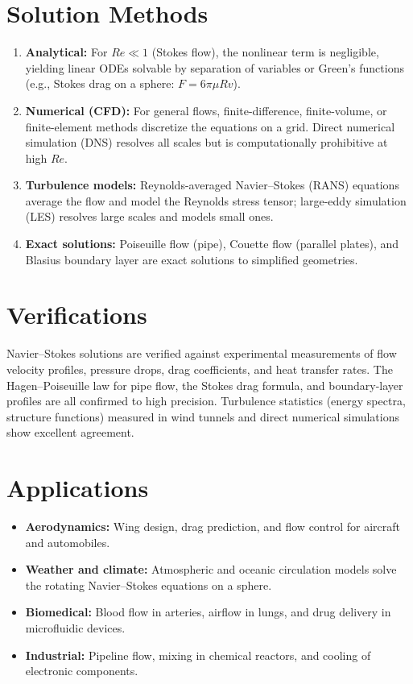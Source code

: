 \section*{Solution Methods}

\begin{enumerate}
  \item \textbf{Analytical:} For $Re \ll 1$ (Stokes flow), the nonlinear term is negligible, yielding linear ODEs solvable by separation of variables or Green's functions (e.g., Stokes drag on a sphere: $F = 6\pi\mu R v$).
  \item \textbf{Numerical (CFD):} For general flows, finite-difference, finite-volume, or finite-element methods discretize the equations on a grid. Direct numerical simulation (DNS) resolves all scales but is computationally prohibitive at high $Re$.
  \item \textbf{Turbulence models:} Reynolds-averaged Navier--Stokes (RANS) equations average the flow and model the Reynolds stress tensor; large-eddy simulation (LES) resolves large scales and models small ones.
  \item \textbf{Exact solutions:} Poiseuille flow (pipe), Couette flow (parallel plates), and Blasius boundary layer are exact solutions to simplified geometries.
\end{enumerate}
\section*{Verifications}

Navier--Stokes solutions are verified against experimental measurements of flow velocity profiles, pressure drops, drag coefficients, and heat transfer rates. The Hagen--Poiseuille law for pipe flow, the Stokes drag formula, and boundary-layer profiles are all confirmed to high precision. Turbulence statistics (energy spectra, structure functions) measured in wind tunnels and direct numerical simulations show excellent agreement.
\section*{Applications}

\begin{itemize}
  \item \textbf{Aerodynamics:} Wing design, drag prediction, and flow control for aircraft and automobiles.
  \item \textbf{Weather and climate:} Atmospheric and oceanic circulation models solve the rotating Navier--Stokes equations on a sphere.
  \item \textbf{Biomedical:} Blood flow in arteries, airflow in lungs, and drug delivery in microfluidic devices.
  \item \textbf{Industrial:} Pipeline flow, mixing in chemical reactors, and cooling of electronic components.
\end{itemize}
